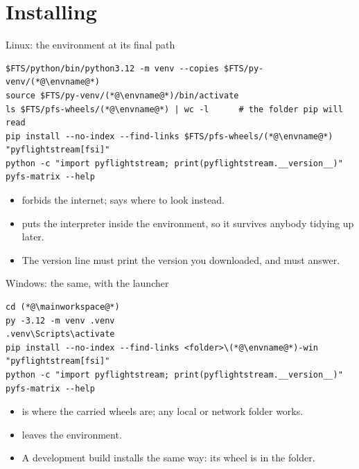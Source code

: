 \documentclass[aspectratio=169,11pt]{beamer}
\begin{document}
\section{Installing}

\begin{frame}[fragile]{Linux: the environment at its final path}
\begin{lstlisting}[style=ftsbase]
$FTS/python/bin/python3.12 -m venv --copies $FTS/py-venv/(*@\envname@*)
source $FTS/py-venv/(*@\envname@*)/bin/activate
ls $FTS/pfs-wheels/(*@\envname@*) | wc -l      # the folder pip will read
pip install --no-index --find-links $FTS/pfs-wheels/(*@\envname@*) "pyflightstream[fsi]"
python -c "import pyflightstream; print(pyflightstream.__version__)"
pyfs-matrix --help
\end{lstlisting}
\begin{itemize}\small
  \item {} forbids the internet;  says where
        to look instead.
  \item {} puts the interpreter inside the environment, so it
        survives anybody tidying up  later.
  \item The version line must print the version you downloaded, and
         must answer.
\end{itemize}
\end{frame}

\begin{frame}[fragile]{Windows: the same, with the launcher}
\begin{lstlisting}[style=ftsbase]
cd (*@\mainworkspace@*)
py -3.12 -m venv .venv
.venv\Scripts\activate
pip install --no-index --find-links <folder>\(*@\envname@*)-win "pyflightstream[fsi]"
python -c "import pyflightstream; print(pyflightstream.__version__)"
pyfs-matrix --help
\end{lstlisting}
\begin{itemize}\small
  \item {} is where the carried wheels are; any local or network
        folder works.
  \item {} leaves the environment.
  \item A development build installs the same way: its wheel is in the folder.
\end{itemize}
\end{frame}
\end{document}
